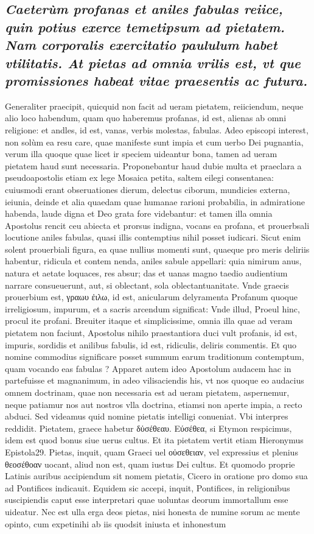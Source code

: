 \documentclass{article}
\begin{document}
\begin{pages}
\subsection*{\textit{Caeterùm profanas et aniles fabulas reiice, quin potius exerce temetipsum ad pietatem. Nam corporalis exercitatio paululum habet vtilitatis. At pietas ad omnia vrilis est, vt que promissiones habeat vitae praesentis ac futura. }}\pstart Generaliter praecipit, quicquid non facit ad ueram pietatem, reiiciendum, neque alio loco habendum, quam quo haberemus profanas, id est, alienas ab omni religione: et andles, id est, vanas, verbis molestas, fabulas. Adeo episcopi interest, non solùm ea resu care, quae manifeste sunt impia et cum uerbo Dei pugnantia, verum illa quoque quae licet ir speciem uideantur bona, tamen ad ueram pietatem haud sunt necessaria. Proponebantur  haud dubie multa et praeclara a pseudoapostolis etiam ex lege Mosaica petita, saltem eilegi consentanea: cuiusmodi erant obseruationes dierum, delectus ciborum, mundicies externa, ieiunia, deinde et alia quaedam quae humanae rarioni probabilia, in admiratione habenda, laude digna et Deo grata fore videbantur: et tamen illa omnia Apostolus rencit ceu abiecta et prorsus indigna, vocans ea profana, et prouerbsali locutione aniles fabulas, quasi illis contemptius nihil posset iudicari. Sicut enim solent prouerbiali figura, ea quae nullius momenti sunt, quaeque pro meris deliriis habentur, ridicula et contem nenda, aniles sabule appellari: quia nimirum anus, natura et aetate loquaces, res absur; das et uanas magno taedio audientium narrare consueuerunt, aut, si oblectant, sola oblectantuanitate. Vnde graecis prouerbium est, γραωυ ἐιλω, id est, anicularum delyramenta Profanum quoque irreligiosum, impurum, et a sacris arcendum significat: Vnde illud, Proeul hinc, procul ite profani. Breuiter itaque et simplicissime, omnia illa quae ad veram pietatem non faciunt, Apostolus nihilo praestantiora duci vult profanis, id est, impuris, sordidis et anilibus fabulis, id est, ridiculis, deliris commentis. Et quo nomine commodius significare posset summum earum traditionum contemptum, quam vocando eas fabulas ? Apparet autem ideo Apostolum audacem hac in partefuisse et magnanimum, in adeo vilisaciendis his, vt nos quoque eo audacius omnem doctrinam, quae non necessaria est ad ueram pietatem, aspernemur, neque patiamur nos aut nostros vlla doctrina, etiamsi non aperte impia, a recto abduci. Sed videamus quid nomine pietatis intelligi conueniat. Vbi interpres reddidit. Pietatem, graece habetur δὐσέθεαυ. Εύσέθεα, si Etymon respicimus, idem est quod bonus siue uerus cultus. Et ita pietatem vertit etiam Hieronymus Epistola29. Pietas, inquit, quam Graeci uel οὐσεθειαν, vel expressius et plenius θεοσέθοαν uocant, aliud non est, quam iustus Dei cultus. Et quomodo proprie Latinis auribus accipiendum sit nomem pietatis, Cicero in oratione pro domo sua ad Pontifices indicauit. Equidem sic accepi, inquit, Pontifices, in religionibus suscipiendis caput esse interpretari quae uoluntas deorum immortallum esse uideatur. Nec est ulla erga deos pietas, nisi honesta de numine sorum ac mente opinto, cum expetinihi ab iis quodsit iniusta et inhonestum  \pend

\end{pages}
\end{document}
